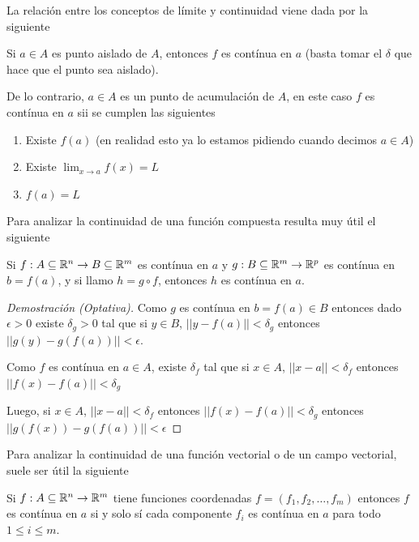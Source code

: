 La relación entre los conceptos de límite y continuidad viene dada por la siguiente

\begin{observation}
Si $a \in A$ es punto aislado de $A$, entonces $f$ es contínua en $a$ (basta tomar el $\delta$ que hace que el punto sea aislado).

De lo contrario, $a \in A$ es un punto de acumulación de $A$, en este caso $f$ es contínua en $a$ sii se cumplen las siguientes

\begin{enumerate}
\item Existe $f(a)$ (en realidad esto ya lo estamos pidiendo cuando decimos $a \in A$)

\item Existe $\displaystyle \lim_{x \to a} f(x) = L$ 

\item $f(a) = L$
\end{enumerate}
\end{observation}

Para analizar la continuidad de una función compuesta resulta muy útil el siguiente 

\begin{theorem}
Si $f : A \subseteq \mathbb{R}^n \to B \subseteq \mathbb{R}^m$ es contínua en $a$ y $ g : B \subseteq \mathbb{R}^m \to \mathbb{R}^p$ es contínua en $b = f(a)$, y si llamo $h = g \circ f$, entonces $h$ es contínua en $a$.
\end{theorem}

\begin{proof}[Demostración (Optativa)]
Como $g$ es contínua en $b = f(a) \in B$ entonces dado $\epsilon > 0$ existe $\delta_g > 0$ tal que si $y \in B$, $||y - f(a)|| < \delta_g$ entonces $||g(y) - g(f(a))|| < \epsilon$.

Como $f$ es contínua en $a \in A$, existe $\delta_f$ tal que si $x \in A$, $||x-a|| < \delta_f$ entonces $||f(x) - f(a)|| < \delta_g$

Luego, si $x \in A$, $||x-a|| < \delta_f$ entonces $||f(x) - f(a)|| < \delta_g $ entonces $||g(f(x)) - g(f(a))|| < \epsilon$
\end{proof}

Para analizar la continuidad de una función vectorial o de un campo vectorial, suele ser útil la siguiente

\begin{observation}
Si $f : A \subseteq \mathbb{R}^n \to \mathbb{R}^m$ tiene funciones coordenadas $f = (f_1, f_2, \ldots, f_m)$ entonces $f$ es contínua en $a$ si y solo sí cada componente $f_i$ es contínua en $a$ para todo $1 \leq i \leq m$.
\end{observation}

